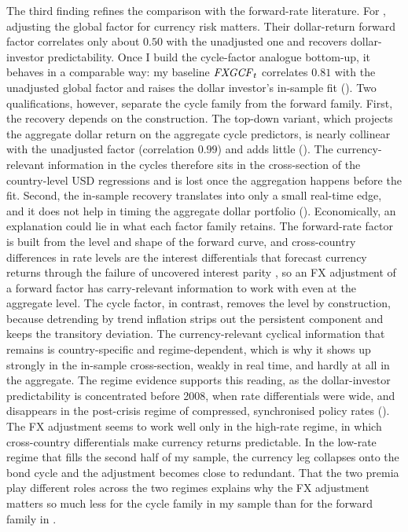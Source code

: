 \bigskip
The third finding refines the comparison with the forward-rate literature.
For \citet{dahlquist2013}, adjusting the global factor for currency risk
matters. Their dollar-return forward factor correlates only about $0.50$ with
the unadjusted one and recovers dollar-investor predictability. Once I
build the cycle-factor analogue bottom-up, it behaves in a comparable way:
my baseline $\mathit{FXGCF}_{t}$ correlates $0.81$ with the unadjusted global
factor and raises the dollar investor's in-sample fit
(). Two qualifications, however, separate the cycle
family from the forward family. First, the recovery depends on the
construction. The top-down variant, which projects the aggregate dollar
return on the aggregate cycle predictors, is nearly collinear with the
unadjusted factor (correlation $0.99$) and adds little
(). The currency-relevant information in
the cycles therefore sits in the cross-section of the country-level USD
regressions and is lost once the aggregation happens before the fit.
Second, the in-sample recovery translates into only a small real-time edge, and it does not help in timing the
aggregate dollar portfolio (). Economically, an
explanation could lie in what each factor family retains. The forward-rate
factor is built from the level and shape of the forward curve, and
cross-country differences in rate levels are the interest
differentials that forecast currency returns through the failure of
uncovered interest parity \citep{fama1984}, so an FX adjustment of a forward factor has
carry-relevant information to work with even at the aggregate level. The
cycle factor, in contrast, removes the level by construction, because
detrending by trend inflation strips out the persistent component and keeps the transitory deviation. The currency-relevant
cyclical information that remains is country-specific and regime-dependent,
which is why it shows up strongly in the in-sample cross-section, weakly in
real time, and hardly at all in the aggregate. The regime evidence supports
this reading, as the dollar-investor predictability is concentrated before
2008, when rate differentials were wide, and disappears in the post-crisis
regime of compressed, synchronised policy rates ().
The FX adjustment seems to work well only in the high-rate regime, in
which cross-country differentials make currency returns predictable. In the
low-rate regime that fills the second half of my sample, the
currency leg collapses onto the bond cycle and the adjustment becomes close to
redundant. That the two premia play different roles across the two regimes
explains why the FX adjustment matters so much less for the cycle family in my
sample than for the forward family in \citet{dahlquist2013}.

